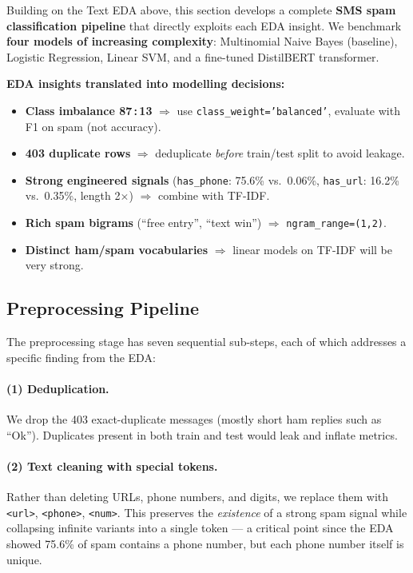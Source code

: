 \label{sec:a2_text}

Building on the Text EDA above, this section develops a complete \textbf{SMS spam classification pipeline} that directly exploits each EDA insight. We benchmark \textbf{four models of increasing complexity}: Multinomial Naive Bayes (baseline), Logistic Regression, Linear SVM, and a fine-tuned DistilBERT transformer.

\begin{importantbox}
\textbf{EDA insights translated into modelling decisions:}
\begin{itemize}
    \item \textbf{Class imbalance 87\,:\,13} $\Rightarrow$ use \texttt{class\_weight='balanced'}, evaluate with F1 on spam (not accuracy).
    \item \textbf{403 duplicate rows} $\Rightarrow$ deduplicate \emph{before} train/test split to avoid leakage.
    \item \textbf{Strong engineered signals} (\texttt{has\_phone}: 75.6\% vs.\ 0.06\%, \texttt{has\_url}: 16.2\% vs.\ 0.35\%, length 2$\times$) $\Rightarrow$ combine with TF-IDF.
    \item \textbf{Rich spam bigrams} (``free entry'', ``text win'') $\Rightarrow$ \texttt{ngram\_range=(1,2)}.
    \item \textbf{Distinct ham/spam vocabularies} $\Rightarrow$ linear models on TF-IDF will be very strong.
\end{itemize}
\end{importantbox}

\subsection{Preprocessing Pipeline}

The preprocessing stage has seven sequential sub-steps, each of which addresses a specific finding from the EDA:

\paragraph{(1) Deduplication.} We drop the 403 exact-duplicate messages (mostly short ham replies such as ``Ok''). Duplicates present in both train and test would leak and inflate metrics.

\paragraph{(2) Text cleaning with special tokens.} Rather than deleting URLs, phone numbers, and digits, we replace them with \texttt{<url>}, \texttt{<phone>}, \texttt{<num>}. This preserves the \emph{existence} of a strong spam signal while collapsing infinite variants into a single token --- a critical point since the EDA showed 75.6\% of spam contains a phone number, but each phone number itself is unique.

